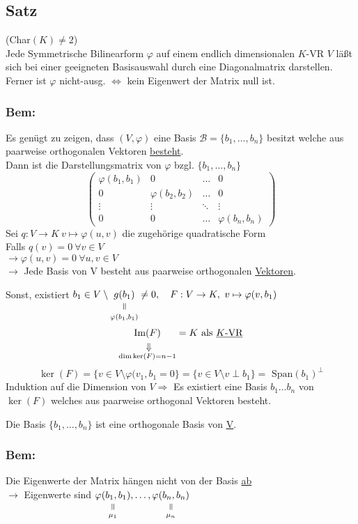 \documentclass[titlepage,12pt,a4paper,ngerman]{report}
\newcommand{\verteq}{\rotatebox{90}{$\,=$}}
\newcommand{\equalto}[2]{\underset{\scriptstyle\overset{\mkern4mu\verteq}{#2}}{#1}}
\newcommand{\custo}[3]{\underset{\scriptstyle\overset{\mkern4mu\rotatebox{-90}{$\,#1$}}{#3}}{#2}}
\newcommand{\tx}[1]{\textrm{#1}}
\begin{document}
\subsection{Satz}
(Char$(K) \neq 2$)\\
\indent Jede Symmetrische Bilinearform $\varphi$ auf einem endlich dimensionalen $K$-VR $V$ läßt sich bei einer geeigneten Basisauswahl durch eine Diagonalmatrix darstellen. Ferner ist $\varphi$ nicht-ausg. $\Leftrightarrow$ kein Eigenwert der Matrix null ist.

\subsubsection*{Bem:}
Es genügt zu zeigen, dass $ (V,\varphi) $ eine Basis $ \mathcal{B} = \{b_1,\dots, b_n\} $ besitzt welche aus paarweise orthogonalen Vektoren \underline{besteht}.\\
Dann ist die Darstellungsmatrix von $ \varphi $ bzgl. $ \{b_1,\dots , b_n\}$
$$\begin{pmatrix}
\varphi(b_1,b_1) & 0 & \dots & 0 \\
0 & \varphi(b_2,b_2) & \dots & 0 \\
\vdots& \vdots & \ddots & \vdots \\
0 & 0 &\dots & \varphi(b_n,b_n)
\end{pmatrix}$$
Sei $ q: V \to K \ v \mapsto \varphi(u,v) $ die zugehörige quadratische Form\\
Falls $ q(v) = 0 \ \forall v \in V $\\
$ \rightarrow \varphi(u,v) = 0 \ \forall u,v \in V $\\
$ \rightarrow $ Jede Basis von V besteht aus paarweise orthogonalen \underline{Vektoren}.

Sonst, existiert $b_1 \in V\setminus \equalto{g(b_1)}{\varphi(b_1, b_1)} \neq 0, \quad F:V \to K,\ v \mapsto \varphi(v,b_1)$
$$\custo{\Rightarrow}{\tx{Im}(F)}{\dim \ker (F) = n -1} = K \tx{ als \underline{$K$-VR}}$$
$$\ker (F) = \{v \in V \setminus \varphi(v_1,b_1=0\} = \{v \in V \setminus v \perp b_1\} = \tx{ Span}(b_1)^\perp$$
Induktion auf die Dimension von $V \Rightarrow$ Es existiert eine Basis $b_1 \dots b_n$ von $\ker(F)$ welches aus paarweise orthogonal Vektoren besteht.

Die Basis $ \{b_1, \dots , b_n\} $ ist eine orthogonale Basis von \underline{\underline{V}}.\\
\subsubsection*{Bem:}
Die Eigenwerte der Matrix hängen nicht von der Basis \underline{ab}\\
$ \rightarrow $ Eigenwerte sind $ \equalto{\varphi(b_1,b_1)}{\mu_1} , \dots , \equalto{\varphi(b_n,b_n)}{\mu_n} $
\end{document}
